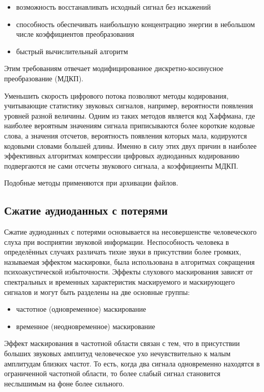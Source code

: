 \documentclass[a4paper]{report}
\begin{document}
\begin{itemize}
\item возможность восстанавливать исходный сигнал без искажений
\item способность обеспечивать наибольшую концентрацию энергии в небольшом числе коэффициентов преобразования
\item быстрый вычислительный алгоритм
\end{itemize}
    
Этим требованиям отвечает модифицированное дискретно-косинусное преобразование (МДКП).

Уменьшить скорость цифрового потока позволяют методы кодирования, учитывающие статистику звуковых сигналов, например, вероятности появления уровней разной величины. Одним из таких методов является код Хаффмана, где наиболее вероятным значениям сигнала приписываются более короткие кодовые слова, а значения отсчетов, вероятность появления которых мала, кодируются кодовыми словами большей длины. Именно в силу этих двух причин в наиболее эффективных алгоритмах компрессии цифровых аудиоданных кодированию подвергаются не сами отсчеты звукового сигнала, а коэффициенты МДКП.

Подобные методы применяются при архивации файлов. 


\subsection{Сжатие аудиоданных с потерями}
Сжатие аудиоданных с потерями основывается на несовершенстве человеческого слуха при восприятии звуковой информации. Неспособность человека в определённых случаях различать тихие звуки в присутствии более громких, называемая эффектом маскировки, была использована в алгоритмах сокращения психоакустической избыточности. Эффекты слухового маскирования зависят от спектральных и временных характеристик маскируемого и маскирующего сигналов и могут быть разделены на две основные группы:
\begin{itemize}
\item частотное (одновременное) маскирование
\item временное (неодновременное) маскирование
\end{itemize}
Эффект маскирования в частотной области связан с тем, что в присутствии больших звуковых амплитуд человеческое ухо нечувствительно к малым амплитудам близких частот. То есть, когда два сигнала одновременно находятся в ограниченной частотной области, то более слабый сигнал становится неслышимым на фоне более сильного.
\end{document}

